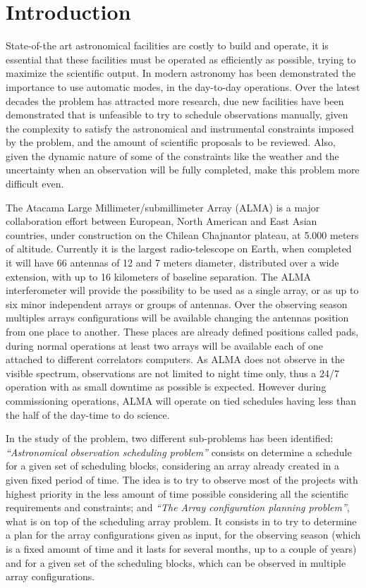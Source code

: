 \chapter{Introduction}

State-of-the art astronomical facilities are costly to build and operate, it is essential that these facilities 
must be operated as efficiently as possible, trying to maximize the scientific output. In modern astronomy has been
demonstrated the importance to use automatic modes, in the day-to-day operations.
Over the latest decades the problem has attracted more research, due new facilities have been
demonstrated that is unfeasible to try to schedule observations manually, given the complexity to satisfy
the astronomical and instrumental constraints imposed by the problem, and the amount of scientific
proposals to be reviewed. Also, given the dynamic nature of some of the constraints like the weather and
the uncertainty when an observation will be fully completed, make this problem more difficult even.

The Atacama Large Millimeter/submillimeter Array (ALMA) is a major collaboration effort between
European, North American and East Asian countries, under construction on the Chilean Chajnantor
plateau, at 5.000 meters of altitude. Currently it is the largest radio-telescope on Earth, when completed it
will have 66 antennas of 12 and 7 meters diameter, distributed over a wide extension, with up to 16 kilometers
of baseline separation. The ALMA interferometer will provide the possibility to be used as a single
array, or as up to six minor independent arrays or groups of antennas. Over the observing season
multiples arrays configurations will be available changing the antennas position from one place to
another. These places are already defined positions called pads, during normal operations at least two
arrays will be available each of one attached to different correlators computers. As ALMA does not
observe in the visible spectrum, observations are not limited to night time only, thus a 24/7 operation
with as small downtime as possible is expected. However during commissioning operations, ALMA will operate on tied schedules having less than the half of the day-time to do science.

In the study of the problem, two different sub-problems has been identified: \textit{``Astronomical observation scheduling problem''} 
consists on determine a schedule for a given set of scheduling blocks, considering an array already created in a given fixed
period of time. The idea is to try to observe most of the projects with highest priority in the less amount
of time possible considering all the scientific requirements and constraints; and \textit{``The  Array configuration planning problem''}, what  
is on top of the scheduling array problem. It consists in to try to determine a plan for the array configurations given as input,
for the observing season (which is a fixed amount of time and it lasts for several months, up
to a couple of years) and for a given set of the scheduling blocks, which can be observed in
multiple array configurations.

